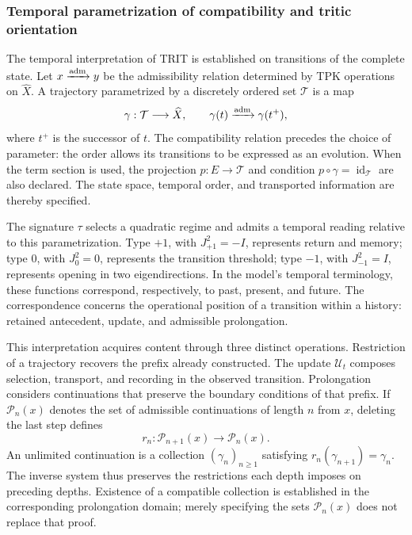 \subsubsection{Temporal parametrization of compatibility and tritic orientation}
\label{trit-temporal-compatibilidad}

The temporal interpretation of TRIT is established on transitions of the
complete state. Let \(x\xrightarrow{\rm adm}y\) be the admissibility relation
determined by TPK operations on \(\widehat X\). A trajectory parametrized
by a discretely ordered set \(\mathcal T\) is a map
\[
 \gamma:\mathcal T\longrightarrow\widehat X,\qquad
 \gamma(t)\xrightarrow{\rm adm}\gamma(t^+),
\]
where \(t^+\) is the successor of \(t\). The compatibility relation
precedes the choice of parameter: the order allows its transitions to
be expressed as an evolution. When the term section is used, the
projection \(p:E\to\mathcal T\) and condition
\(p\circ\gamma=\operatorname{id}_{\mathcal T}\) are also declared.
The state space, temporal order, and transported information are thereby specified.

The signature \(\tau\) selects a quadratic regime and admits a temporal
reading relative to this parametrization. Type \(+1\), with
\(J_{+1}^{2}=-I\), represents return and memory; type \(0\), with
\(J_0^{2}=0\), represents the transition threshold; type \(-1\), with
\(J_{-1}^{2}=I\), represents opening in two eigendirections. In the
model's temporal terminology, these functions correspond, respectively,
to past, present, and future. The correspondence concerns the operational
position of a transition within a history: retained antecedent, update,
and admissible prolongation.

This interpretation acquires content through three distinct operations.
Restriction of a trajectory recovers the prefix already constructed.
The update \(\mathcal U_t\) composes selection, transport, and recording
in the observed transition. Prolongation considers continuations that
preserve the boundary conditions of that prefix. If
\(\mathcal P_n(x)\) denotes the set of admissible continuations of
length \(n\) from \(x\), deleting the last step defines
\[
 r_n:\mathcal P_{n+1}(x)\longrightarrow\mathcal P_n(x).
\]
An unlimited continuation is a collection \((\gamma_n)_{n\geq1}\)
satisfying \(r_n(\gamma_{n+1})=\gamma_n\). The inverse system thus
preserves the restrictions each depth imposes on preceding depths.
Existence of a compatible collection is established in the corresponding
prolongation domain; merely specifying the sets \(\mathcal P_n(x)\)
does not replace that proof.

